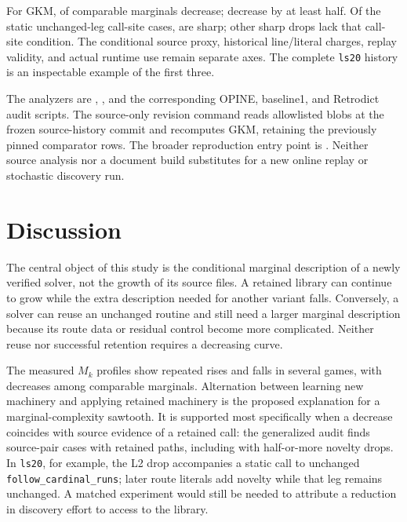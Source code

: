 \documentclass[11pt]{article}
\theoremstyle{definition}
\theoremstyle{remark}
\begin{document}
For GKM, \GKMDecreases{} of \GKMComparable{} comparable marginals decrease;
\GKMSharpDrops{} decrease by at least half. Of the \GKMHardReuse{} static unchanged-leg
call-site cases, \GKMCoupledWitnesses{} are sharp; \GKMUncoupledSharp{} other sharp
drops lack that call-site condition. The conditional source proxy, historical
line/literal charges, replay validity, and actual runtime use remain separate axes.
The complete \texttt{ls20} history is an inspectable example of the first three.

The analyzers are ,
, and the corresponding OPINE, baseline1,
and Retrodict audit scripts. The source-only revision command
 reads allowlisted blobs
at the frozen source-history commit and recomputes GKM, retaining the previously
pinned comparator rows. The broader reproduction entry point is
. Neither source analysis nor
a document build substitutes for a new online replay or stochastic discovery run.

\section{Discussion}
\label{sec:discussion}
The central object of this study is the conditional marginal description of a
newly verified solver, not the growth of its source files. A retained library can
continue to grow while the extra description needed for another variant falls.
Conversely, a solver can reuse an unchanged routine and still need a larger
marginal description because its route data or residual control become more
complicated. Neither reuse nor successful retention requires a decreasing curve.

The measured $M_k$ profiles show repeated rises and falls in several games, with
\GKMDecreases{} decreases among \GKMComparable{} comparable marginals. Alternation
between learning new machinery and applying retained machinery is the proposed
explanation for a marginal-complexity sawtooth. It is supported most specifically
when a decrease coincides with source evidence of a retained call: the generalized
audit finds \GKMGeneralPaths{} source-pair cases with retained paths, including
\GKMGeneralSharpPaths{} with half-or-more novelty drops. In \texttt{ls20}, for example, the L2 drop accompanies
a static call to unchanged \texttt{follow\_cardinal\_runs}; later route literals
add novelty while that leg remains unchanged. A matched experiment would still
be needed to attribute a reduction in discovery effort to access to the library.
\end{document}
